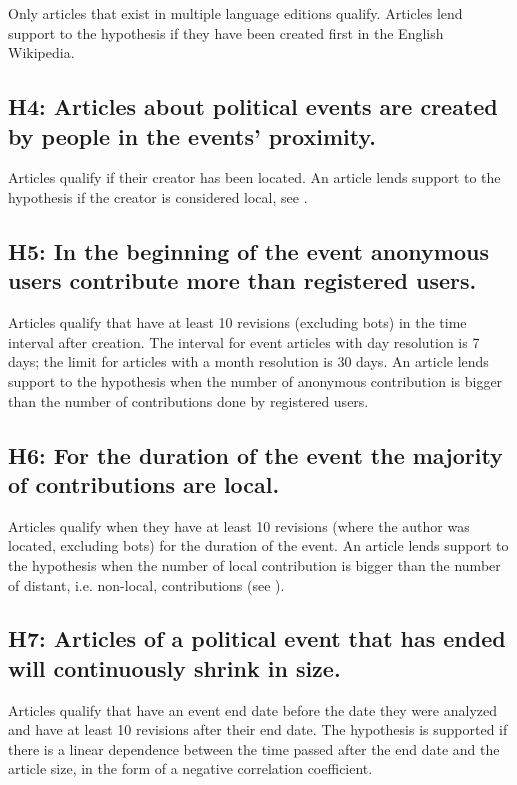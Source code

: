 Only articles that exist in multiple language editions qualify.
Articles lend support to the hypothesis if they have been created first in the English Wikipedia.

\subsection*{H4: Articles about political events are created by people in the events' proximity.}

Articles qualify if their creator has been located.
An article lends support to the hypothesis if the creator is considered local, see .

\subsection*{H5: In the beginning of the event anonymous users contribute more than registered users.}

Articles qualify that have at least 10 revisions (excluding bots) in the time interval after creation.
The interval for event articles with day resolution is 7 days; the limit for articles with a month resolution is 30 days.
An article lends support to the hypothesis when the number of anonymous contribution is bigger than the number of contributions done by registered users.

\subsection*{H6: For the duration of the event the majority of contributions are local.}

Articles qualify when they have at least 10 revisions (where the author was located, excluding bots) for the duration of the event.
An article lends support to the hypothesis when the number of local contribution is bigger than the number of distant, i.e. non-local, contributions (see ).

\subsection*{H7: Articles of a political event that has ended will continuously shrink in size.}

Articles qualify that have an event end date before the date they were analyzed and have at least 10 revisions after their end date.
The hypothesis is supported if there is a linear dependence between the time passed after the end date and the article size, in the form of a negative correlation coefficient.


